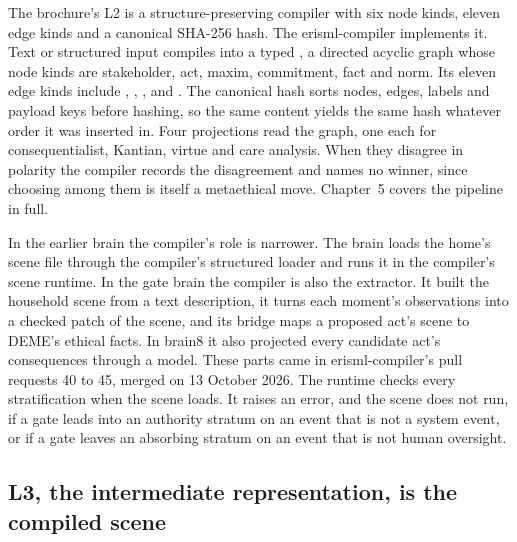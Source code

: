 The brochure's L2 is a structure-preserving compiler with six node kinds, eleven edge kinds and a
canonical SHA-256 hash.
The erisml-compiler implements it. Text or structured input compiles into a typed
, a directed acyclic graph whose node kinds are stakeholder, act, maxim,
commitment, fact and norm. Its eleven edge kinds include , ,
,  and .
The canonical hash sorts nodes, edges, labels and payload keys before hashing, so the same content
yields the same hash whatever order it was inserted in.
Four projections read the graph, one each for consequentialist, Kantian, virtue and care
analysis. When they disagree in polarity the compiler records the disagreement and names no
winner, since choosing among them is itself a metaethical move.
Chapter~5 covers the pipeline in full.

In the earlier brain the compiler's role is narrower. The brain loads the home's scene file through
the compiler's structured loader and runs it in the compiler's scene runtime.
In the gate brain the compiler is also the extractor. It built the household scene from a text
description, it turns each moment's observations into a checked patch of the scene, and its bridge
maps a proposed act's scene to DEME's ethical facts. In brain8 it also projected every candidate
act's consequences through a model.
These parts came in erisml-compiler's pull requests 40 to 45, merged on 13 October 2026.
The runtime checks every stratification when the scene loads. It raises an error, and the scene
does not run, if a gate leads into an authority stratum on an event that is not a system event,
or if a gate leaves an absorbing stratum on an event that is not human oversight.

\subsection*{L3, the intermediate representation, is the compiled scene}

